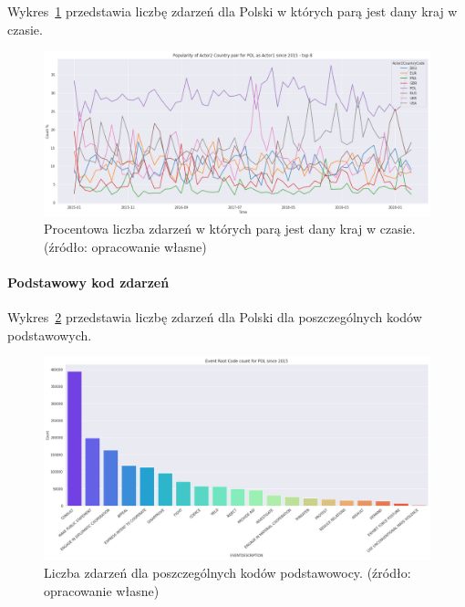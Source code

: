 \documentclass[11pt]{report}
\begin{document}
    Wykres~\ref{fig:PLpairPerc} przedstawia liczbę zdarzeń dla Polski w których parą jest dany kraj w czasie.
    \begin{figure}[ht!]
        \centering
        \includegraphics[width=1 \textwidth]{fig/PL/PLactor2PairPercinTIME.png}
        \caption{Procentowa liczba zdarzeń w których parą jest dany kraj w czasie. (źródło: opracowanie własne)}
        \label{fig:PLpairPerc}
    \end{figure}

    \paragraph{Podstawowy kod zdarzeń}

    Wykres~\ref{fig:PLPERC} przedstawia liczbę zdarzeń dla Polski dla poszczególnych kodów podstawowych.


    \begin{figure}[ht!]
        \centering
        \includegraphics[width=1 \textwidth]{fig/PL/PLERC.png}
        \caption{Liczba zdarzeń dla poszczególnych kodów podstawowocy. (źródło: opracowanie własne)}
        \label{fig:PLPERC}
    \end{figure}
\end{document}
